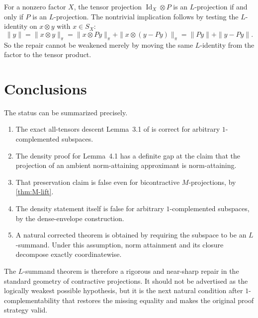 \documentclass[11pt]{article}
\theoremstyle{definition}
\theoremstyle{remark}
\newcommand{\Id}{\operatorname{Id}}
\begin{document}
For a nonzero factor $X$, the tensor projection $\Id_X\otimes P$ is an $L$-projection if and only if $P$ is an $L$-projection.  The nontrivial implication follows by testing the $L$-identity on $x\otimes y$ with $x\in S_X$:
\[
 \|y\|
 =\|x\otimes y\|_\pi
 =\|x\otimes Py\|_\pi+\|x\otimes(y-Py)\|_\pi
 =\|Py\|+\|y-Py\|.
\]
So the repair cannot be weakened merely by moving the same $L$-identity from the factor to the tensor product.

\section{Conclusions}

The status can be summarized precisely.

\begin{enumerate}[leftmargin=2em]
\item The exact all-tensors descent Lemma~3.1 of \cite{GarciaLirolaEtAl2025} is correct for arbitrary $1$-complemented subspaces.
\item The density proof for Lemma~4.1 has a definite gap at the claim that the projection of an ambient norm-attaining approximant is norm-attaining.
\item That preservation claim is false even for bicontractive $M$-projections, by \cref{thm:M-lift}.
\item The density statement itself is false for arbitrary $1$-complemented subspaces, by the dense-envelope construction.
\item A natural corrected theorem is obtained by requiring the subspace to be an $L$-summand.  Under this assumption, norm attainment and its closure decompose exactly coordinatewise.
\end{enumerate}

The $L$-summand theorem is therefore a rigorous and near-sharp repair in the standard geometry of contractive projections.  It should not be advertised as the logically weakest possible hypothesis, but it is the next natural condition after $1$-complementability that restores the missing equality and makes the original proof strategy valid.
\end{document}
